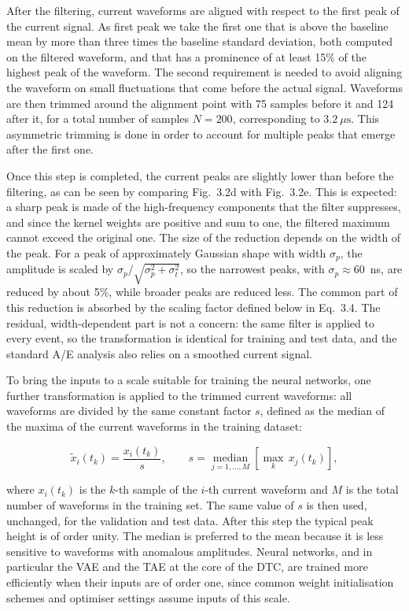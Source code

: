After the filtering, current waveforms are aligned with respect to the first peak of the current signal. As first peak we take the first one that is above the baseline mean by more than three times the baseline standard deviation, both computed on the filtered waveform, and that has a prominence of at least 15\% of the highest peak of the waveform. The second requirement is needed to avoid aligning the waveform on small fluctuations that come before the actual signal. Waveforms are then trimmed around the alignment point with 75 samples before it and 124 after it, for a total number of samples $N = 200$, corresponding to $3.2~\mu\mathrm{s}$. This asymmetric trimming is done in order to account for multiple peaks that emerge after the first one.

Once this step is completed, the current peaks are slightly lower than before the filtering, as can be seen by comparing Fig.~3.2d with Fig.~3.2e. This is expected: a sharp peak is made of the high-frequency components that the filter suppresses, and since the kernel weights are positive and sum to one, the filtered maximum cannot exceed the original one. The size of the reduction depends on the width of the peak. For a peak of approximately Gaussian shape with width $\sigma_p$, the amplitude is scaled by $\sigma_p / \sqrt{\sigma_p^2 + \sigma_t^2}$, so the narrowest peaks, with $\sigma_p \approx 60$~ns, are reduced by about 5\%, while broader peaks are reduced less. The common part of this reduction is absorbed by the scaling factor defined below in Eq.~3.4. The residual, width-dependent part is not a concern: the same filter is applied to every event, so the transformation is identical for training and test data, and the standard A/E analysis also relies on a smoothed current signal.

To bring the inputs to a scale suitable for training the neural networks, one further transformation is applied to the trimmed current waveforms: all waveforms are divided by the same constant factor $s$, defined as the median of the maxima of the current waveforms in the training dataset:

\begin{equation}
    \label{eq:scaling}
    \tilde{x}_i(t_k) = \frac{x_i(t_k)}{s}, \qquad s = \operatorname*{median}_{j = 1, \dots, M} \left[ \max_{k} \, x_j(t_k) \right],
\end{equation}

where $x_i(t_k)$ is the $k$-th sample of the $i$-th current waveform and $M$ is the total number of waveforms in the training set. The same value of $s$ is then used, unchanged, for the validation and test data. After this step the typical peak height is of order unity. The median is preferred to the mean because it is less sensitive to waveforms with anomalous amplitudes. Neural networks, and in particular the \ac{VAE} and the \ac{TAE} at the core of the \ac{DTC}, are trained more efficiently when their inputs are of order one, since common weight initialisation schemes and optimiser settings assume inputs of this scale. 



